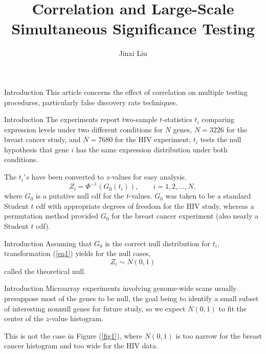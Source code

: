 \documentclass{beamer}
\title{Correlation and Large-Scale Simultaneous Significance Testing}
\author{Jinxi Liu}
\begin{document}
	
\begin{frame}
	
	\titlepage
	
\end{frame}


\begin{frame}[t]{Introduction}\vspace{10pt}
This article concerns the effect of correlation on multiple testing procedures, particularly false discovery rate techniques.

\end{frame}


\begin{frame}[t]{Introduction}\vspace{10pt}
The experiments report two-sample $t$-statistics $t_i$ comparing expression levels under two different conditions for $N$ genes, $N = 3226$ for the breast cancer study, and $N = 7680$ for the HIV experiment; $t_i$ tests the null hypothesis that gene $i$ has the same expression distribution under both conditions.

The $t_i's$ have been converted to $z$-values for easy analysis.
\begin{equation}\label{eq1}
 Z_i = \Phi^{-1}(G_0(t_i)), \qquad i=1,2,...,N,
\end{equation}
where $G_0$ is a putative null cdf for the $t$-values. $G_0$ was taken to be a standard Student $t$ cdf with appropriate degrees of freedom for the HIV study, whereas a permutation method provided $G_0$ for the breast cancer experiment (also nearly a Student $t$ cdf).
\end{frame}

\begin{frame}[t]{Introduction}\vspace{10pt}
Assuming that $G_0$ is the correct null distribution for $t_i$, transformation (\ref{eq1}) yields for the null cases, 
\begin{equation}\label{eq2}
Z_i \sim N(0,1)
\end{equation}
called the theoretical null.

\end{frame}

\begin{frame}[t]{Introduction}\vspace{10pt}
Microarray experiments involving genome-wide scans usually presuppose most of the genes to be null, the goal being to identify a small subset of interesting nonnull genes for future study, so we expect $N(0, 1)$ to fit the center of the $z$-value histogram.

This is not the case in Figure (\ref{fig1}), where $N(0, 1)$ is too narrow for the breast cancer histogram and too wide for the HIV data.

\end{frame}
\end{document}
